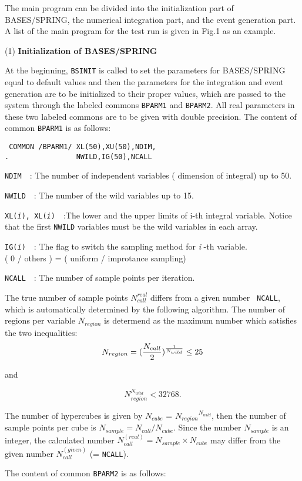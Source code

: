 \par  
\bigskip 
{}  
\par\medskip
The main program can be divided into the initialization part of {\small
BASES/SPRING}, the numerical integration part, and the
event generation part.
A list of the main program for the test run is given in Fig.1 as an example.
\par\medskip
\noindent
(1) {\bf Initialization of BASES/SPRING}  
\par\smallskip
At the beginning, {\tt BSINIT} is called to set the parameters for {\small 
BASES/SPRING} equal to default values and then the parameters for the integration and
event generation are to be initialized to their proper values, which are passed
to the system through the labeled commons {\tt BPARM1} and {\tt BPARM2}. 
All real parameters in these two labeled commons are to be given with double
precision. The content of common {\small\tt BPARM1} is as follows:      
{\small \begin{verbatim}
 COMMON /BPARM1/ XL(50),XU(50),NDIM, 
.                NWILD,IG(50),NCALL 
\end{verbatim}}
\par
{\small
\begin{description}
\item{\tt NDIM}~~: The number of independent variables ( dimension
of integral) up to 50.
\item{\tt NWILD}~~: The number of the wild variables up
to 15.
\item{\tt XL({\it i}), XL({\it i})}~~:The lower and the upper limits of i-th
integral variable.  Notice 
that the first {\tt NWILD} variables must be the wild variables in each array.
\item{\tt IG({\it i})}~~: The flag to switch the sampling method for {\it i }-th
variable.\\
( 0 / others ) = ( uniform / improtance sampling)
\item{\tt NCALL}~~: The number of sample points per iteration.
\end{description}}
\par\noindent
The true number of sample points $N_{call}^{real}$ differs from a given number {\tt
NCALL}, which is automatically determined by the following algorithm.
The number of regions per variable $N_{region}$ is determend as the maximum number
which satisfies the two inequalities:
\[
N_{region}  =  ({ N_{call} \over 2 })^{ 1 \over N_{wild}}  \leq 25
\]
\par\noindent
and\par
\[
N_{region}^{N_{wild}}  <  32768.
\]
\par\noindent
The number of hypercubes is given by $N_{cube}$ = ${N_{region}}^{N_{wild}}$, then the
number of sample points per cube is $N_{sample} = N_{call}/N_{cube}$.
Since the number $N_{sample}$ is an integer, the calculated number $N_{call}^{(real)}
= N_{sample}\times N_{cube}$ may differ from the given number $N_{call}^{(given)}$
(= {\tt NCALL}). \par
 The content of common {\tt BPARM2} is as follows:
 
